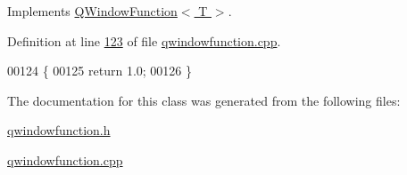 Implements \hyperlink{a00071_ad58fa8c208b487dc2cbe765053228068}{Q\+Window\+Function$<$ T $>$}.



Definition at line \hyperlink{a00127_source_l00123}{123} of file \hyperlink{a00127_source}{qwindowfunction.\+cpp}.


\begin{DoxyCode}
00124 \{
00125     \textcolor{keywordflow}{return} 1.0;
00126 \}
\end{DoxyCode}


The documentation for this class was generated from the following files\+:\begin{DoxyCompactItemize}
\item 
\hyperlink{a00128}{qwindowfunction.\+h}\item 
\hyperlink{a00127}{qwindowfunction.\+cpp}\end{DoxyCompactItemize}
